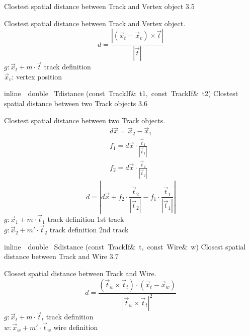 \documentclass{article}
\begin{document}
\begin{cxxentry}
\begin{cxxfunction}
        {Clostest spatial distance between Track and Vertex object}
        {3.5}
\begin{cxxdoc}
Clostest spatial distance between Track and Vertex object.
\begin{displaymath}
d = \frac{|(\vec{x}_t - \vec{x}_v) \times \vec{t}|}{|\vec{t}|}
\end{displaymath}
$g: \vec{x}_t + m\cdot\vec{t}$ track definition\\
$\vec{x}_v$: vertex position
\end{cxxdoc}
\end{cxxfunction}
\begin{cxxfunction}
{inline\ \ double\ }
        {Tdistance}
        {(const\ TrackIf\&\ t1,\ const\ TrackIf\&\ t2)}
        {Clostest spatial distance between two Track objects}
        {3.6}
\begin{cxxdoc}
Clostest spatial distance between two Track objects.
\begin{eqnarray*}
d\vec{x} = \vec{x}_2 - \vec{x}_1\\
f_1 = d\vec{x}\cdot\frac{\vec{t}_1}{|\vec{t}_1|}\\
f_2 = d\vec{x}\cdot\frac{\vec{t}_2}{|\vec{t}_2|}
\end{eqnarray*}
\begin{displaymath}
d = \left| d\vec{x} + f_2\cdot\frac{\vec{t}_2}{|\vec{t}_2|} -
f_1\cdot\frac{\vec{t}_1}{|\vec{t}_1|}\right|
\end{displaymath}
$g: \vec{x}_1 + m\cdot\vec{t}_1$ track definition 1st track\\
$g: \vec{x}_2 + m'\cdot\vec{t}_2$ track definition 2nd track\\
\end{cxxdoc}
\end{cxxfunction}
\begin{cxxfunction}
{inline\ \ double\ }
        {Sdistance}
        {(const\ TrackIf\&\ t,\ const\ Wire\&\ w)}
        {Closest spatial distance between Track and Wire}
        {3.7}
\begin{cxxdoc}
Closest spatial distance between Track and Wire.
\begin{displaymath}
d = \frac{(\vec{t}_w\times\vec{t}_t) \cdot (\vec{x}_t -
\vec{x}_w)}{|\vec{t}_w\times\vec{t}_t|^2}
\end{displaymath}
$g: \vec{x}_t + m\cdot\vec{t}_t$ track definition\\
$w: \vec{x}_w + m'\cdot\vec{t}_w$ wire definition
\end{cxxdoc}
\end{cxxfunction}

\end{cxxentry}
\end{document}
